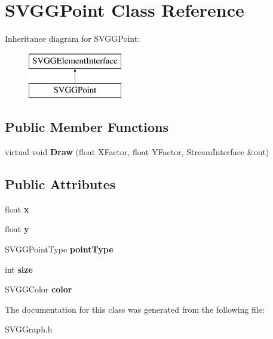 \hypertarget{classSVGGPoint}{
\section{SVGGPoint Class Reference}
\label{classSVGGPoint}
}
Inheritance diagram for SVGGPoint:\begin{figure}[H]
\begin{center}
\leavevmode
\includegraphics[height=2.000000cm]{classSVGGPoint}
\end{center}
\end{figure}
\subsection*{Public Member Functions}
\begin{DoxyCompactItemize}
\item 
\hypertarget{classSVGGPoint_acc2cd157fe0a89b0a02f048da38d94fd}{
virtual void {\bfseries Draw} (float XFactor, float YFactor, StreamInterface \&out)}
\label{classSVGGPoint_acc2cd157fe0a89b0a02f048da38d94fd}

\end{DoxyCompactItemize}
\subsection*{Public Attributes}
\begin{DoxyCompactItemize}
\item 
\hypertarget{classSVGGPoint_a06824ed5ca0622e9abba18bca6879f74}{
float {\bfseries x}}
\label{classSVGGPoint_a06824ed5ca0622e9abba18bca6879f74}

\item 
\hypertarget{classSVGGPoint_a01b94c6f8b1bb006797219773d71054d}{
float {\bfseries y}}
\label{classSVGGPoint_a01b94c6f8b1bb006797219773d71054d}

\item 
\hypertarget{classSVGGPoint_a310903f98b5981ee4ca073b5a6c4b0d2}{
SVGGPointType {\bfseries pointType}}
\label{classSVGGPoint_a310903f98b5981ee4ca073b5a6c4b0d2}

\item 
\hypertarget{classSVGGPoint_adf6e6c9b829965ae2ee54a1bb8a9bd19}{
int {\bfseries size}}
\label{classSVGGPoint_adf6e6c9b829965ae2ee54a1bb8a9bd19}

\item 
\hypertarget{classSVGGPoint_ad2255ea00c9f3ccc3260b1b87524e6e4}{
SVGGColor {\bfseries color}}
\label{classSVGGPoint_ad2255ea00c9f3ccc3260b1b87524e6e4}

\end{DoxyCompactItemize}


The documentation for this class was generated from the following file:\begin{DoxyCompactItemize}
\item 
SVGGraph.h\end{DoxyCompactItemize}

